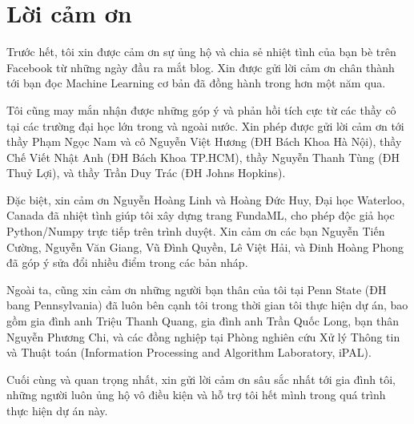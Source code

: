 



\section{Lời cảm ơn}
Trước hết, tôi xin được cảm ơn sự ủng hộ và chia sẻ nhiệt tình của bạn bè trên  Facebook từ những ngày đầu ra mắt blog. Xin được gửi lời cảm ơn chân thành tới bạn đọc Machine Learning cơ bản đã đồng hành trong hơn một năm qua.

Tôi cũng may mắn nhận được những góp ý và phản hồi tích cực từ các thầy cô
tại các trường đại học lớn trong và ngoài nước. Xin phép được gửi lời cảm ơn
tới thầy Phạm Ngọc Nam và cô Nguyễn Việt Hương (ĐH Bách Khoa Hà Nội), thầy Chế
Viết Nhật Anh (ĐH Bách Khoa TP.HCM), thầy Nguyễn Thanh Tùng (ĐH Thuỷ Lợi),
và thầy Trần Duy Trác (ĐH Johns Hopkins).

Đặc biệt, xin cảm ơn Nguyễn Hoàng Linh và Hoàng Đức Huy, Đại học Waterloo,
Canada đã nhiệt tình giúp tôi xây dựng trang FundaML, cho phép độc giả
học Python/Numpy trực tiếp trên trình duyệt. Xin cảm ơn các bạn Nguyễn
Tiến Cường, Nguyễn Văn Giang, Vũ Đình Quyền, Lê Việt Hải, và Đinh Hoàng Phong đã
góp ý sửa đổi nhiều điểm trong các bản nháp.

Ngoài ta, cũng xin cảm ơn những người bạn thân của tôi tại Penn State
(ĐH bang Pennsylvania) đã luôn bên cạnh tôi trong thời gian tôi thực hiện dự án,
bao gồm gia đình anh Triệu Thanh Quang, gia đình anh Trần Quốc Long, bạn thân
Nguyễn Phương Chi, và các đồng nghiệp tại Phòng nghiên cứu Xử lý Thông tin và
Thuật toán (Information Processing and Algorithm Laboratory, iPAL).

Cuối cùng và quan trọng nhất, xin gửi lời cảm ơn sâu sắc nhất tới gia đình tôi,
những người luôn ủng hộ vô điều kiện và hỗ trợ tôi hết mình trong quá trình thực
hiện dự án này.






